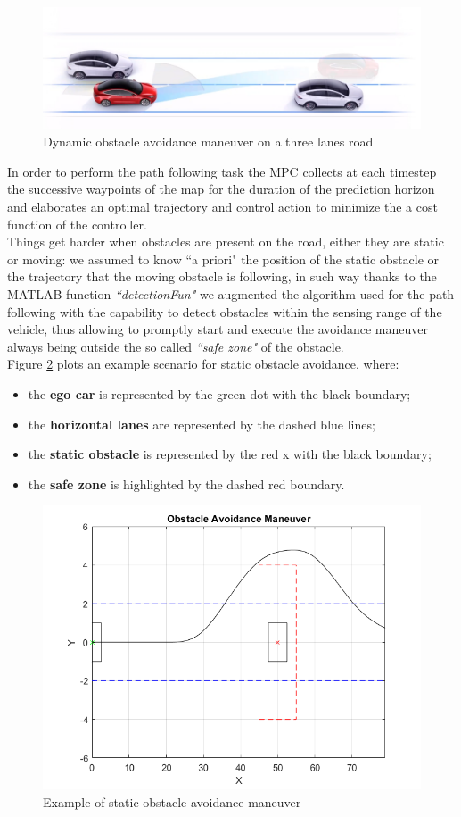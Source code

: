 \begin{figure}[H]
    \centering
    \includegraphics[width=1\textwidth]{Figures/dynamic_avoidance.png}
    \caption{Dynamic obstacle avoidance maneuver on a three lanes road}
      \label{fig:dynamic_avoidance}
\end{figure}
In order to perform the path following task the MPC collects at each timestep the successive waypoints of the map for the duration of the prediction horizon and elaborates an optimal trajectory and control action to minimize the a cost function of the controller.
\\Things get harder when obstacles are present on the road, either they are static or moving: we assumed to know ``a priori" the position of the static obstacle or the trajectory that the moving obstacle is following, in such way thanks to the MATLAB function \textit{``detectionFun"} we augmented the algorithm used for the path following with the capability to detect obstacles within the sensing range of the vehicle, thus allowing to promptly start and execute the avoidance maneuver always being outside the so called \textit{``safe zone"} of the obstacle.\\ Figure \ref{fig:static_avoidance_example} plots an example scenario for static obstacle avoidance, where: 
\begin{itemize}
    \item the \textbf{ego car} is represented by the green dot with the black boundary;
    \item the \textbf{horizontal lanes} are represented by the dashed blue lines;
    \item the \textbf{static obstacle} is represented by the red x with the black boundary;
    \item the \textbf{safe zone} is highlighted by the dashed red boundary.
\end{itemize} 

\begin{figure}[H]
    \centering
    \includegraphics[width=1\textwidth]{Figures/static_avoidance_example.png}
    \caption{Example of static obstacle avoidance maneuver}
      \label{fig:static_avoidance_example}
\end{figure} 
